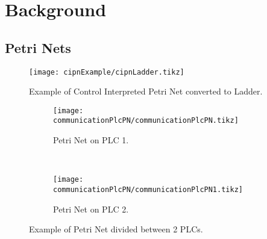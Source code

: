 
\chapter{Background}

\section{Petri Nets}
\label{sec:petriNets}




% 
% 
\usetikzlibrary{arrows,shapes,circuits.plc.ladder,external}

\begin{figure}[H]
  \centering
  \texttt{[image: cipnExample/cipnLadder.tikz]}
  \caption[cipnexample]{Example of Control Interpreted Petri Net converted to Ladder.}
  \label{fig:cipnexampleLadder}
\end{figure}

\begin{figure}[H]
    \centering
    \begin{subfigure}[t]{0.5\textwidth}
        \centering
        \texttt{[image: communicationPlcPN/communicationPlcPN.tikz]}
        \caption{Petri Net on PLC 1.}
        \label{fig:communicationPlcPN}
    \end{subfigure}%
    ~ 
    \begin{subfigure}[t]{0.5\textwidth}
        \centering
  \texttt{[image: communicationPlcPN/communicationPlcPN1.tikz]}
  \caption{Petri Net on PLC 2.}
  \label{fig:communicationPlcPN1}
    \end{subfigure}
    \caption{Example of Petri Net divided between 2 PLCs.}
\end{figure}



